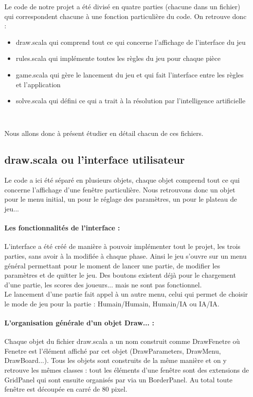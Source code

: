 \documentclass[a4paper]{article}
\begin{document}
Le code de notre projet a été divisé en quatre parties (chacune dans un fichier) qui correspondent chacune à une fonction particulière du code. On retrouve donc : 
\begin{itemize}
\item draw.scala qui comprend tout ce qui concerne l'affichage de l'interface du jeu
\item rules.scala qui implémente toutes les règles du jeu pour chaque pièce
\item game.scala qui gère le lancement du jeu et qui fait l'interface entre les règles et l'application
\item solve.scala qui défini ce qui a trait à la résolution par l'intelligence artificielle
\end{itemize}~ 

Nous allons donc à présent étudier en détail chacun de ces fichiers. 

\subsection{draw.scala ou l'interface utilisateur}

Le code a ici été séparé en plusieurs objets, chaque objet comprend tout ce qui concerne l'affichage d'une fenêtre particulière. Nous retrouvons donc un objet pour le menu initial, un pour le réglage des paramètres, un pour le plateau de jeu... 

\paragraph{Les fonctionnalités de l'interface :}L'interface a été créé de manière à pouvoir implémenter tout le projet, les trois parties, sans avoir à la modifiée à chaque phase. Ainsi le jeu s'ouvre sur un menu général permettant pour le moment de lancer une partie, de modifier les paramètres et de quitter le jeu. Des boutons existent déjà pour le chargement d'une partie, les scores des joueurs... mais ne sont pas fonctionnel. \\

Le lancement d'une partie fait appel à un autre menu, celui qui permet de choisir le mode de jeu pour la partie : Humain/Humain, Humain/IA ou IA/IA. 

\paragraph{L'organisation générale d'un objet Draw... :}Chaque objet du fichier draw.scala a un nom construit comme DrawFenetre où Fenetre est l'élément affiché par cet objet (DrawParameters, DrawMenu, DrawBoard...). Tous les objets sont construits de la même manière et on y retrouve les mêmes classes : tout les éléments d'une fenêtre sont des extensions de GridPanel qui sont ensuite organisés par via un BorderPanel. Au total toute fenêtre est découpée en carré de 80 pixel. \\
\end{document}
